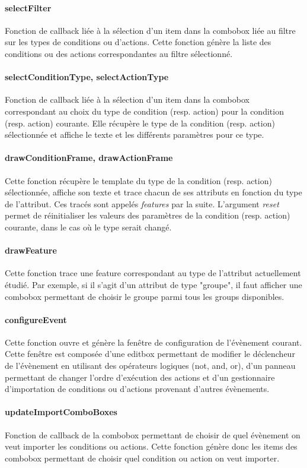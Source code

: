 \documentclass[a4paper]{article}
\begin{document}
\paragraph{selectFilter} Fonction de callback liée à la sélection d'un item dans la combobox liée au filtre sur les types de conditions ou d'actions. Cette fonction génère la liste des conditions ou des actions correspondantes au filtre sélectionné.
\paragraph{selectConditionType, selectActionType} Fonction de callback liée à la sélection d'un item dans la combobox correspondant au choix du type de condition (resp. action) pour la condition (resp. action) courante. Elle récupère le type de la condition (resp. action) sélectionnée et affiche le texte et les différents paramètres pour ce type.
\paragraph{drawConditionFrame, drawActionFrame} Cette fonction récupère le template du type de la condition (resp. action) sélectionnée, affiche son texte et trace chacun de ses attributs en fonction du type de l'attribut. Ces tracés sont appelés \textit{features} par la suite. L'argument \textit{reset} permet de réinitialiser les valeurs des paramètres de la condition (resp. action) courante, dans le cas où le type serait changé.
\paragraph{drawFeature} Cette fonction trace une feature correspondant au type de l'attribut actuellement étudié. Par exemple, si il s'agit d'un attribut de type "groupe", il faut afficher une combobox permettant de choisir le groupe parmi tous les groups disponibles.
\paragraph{configureEvent} Cette fonction ouvre et génère la fenêtre de configuration de l'évènement courant. Cette fenêtre est composée d'une editbox permettant de modifier le déclencheur de l'évènement en utilisant des opérateurs logiques (not, and, or), d'un panneau permettant de changer l'ordre d'exécution des actions et d'un gestionnaire d'importation de conditions ou d'actions provenant d'autres évènements.
\paragraph{updateImportComboBoxes} Fonction de callback de la combobox permettant de choisir de quel évènement on veut importer les conditions ou actions. Cette fonction génère donc les items des combobox permettant de choisir quel condition ou action on veut importer.
\end{document}
